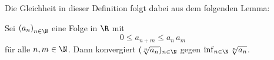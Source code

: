 Die Gleichheit in dieser Definition folgt dabei aus dem folgenden Lemma:

\begin{thLemma}
    Sei $\nSeq a$ eine Folge in $\R$ mit
    \[ 0 \leq a_{n+m} \leq a_n\,a_m \]
    für alle $n,m\in\N$. Dann konvergiert
    $(\sqrt[n]{a_n})_{n\in\N}$ gegen $\inf_{n\in\N} \sqrt[n]{a_n}$.
\end{thLemma}

%

